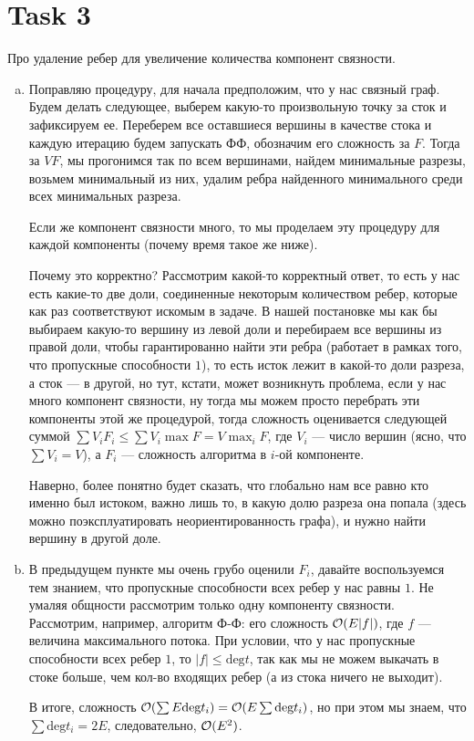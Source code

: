 \section{Task 3}
\begin{task}
    Про удаление ребер для увеличение количества компонент связности.
\end{task}

\begin{solution}
    \begin{enumerate}[a)]
        \item Поправляю процедуру, для начала предположим, что у нас связный граф.
        Будем делать следующее, выберем какую-то произвольную точку за сток и зафиксируем ее.
        Переберем все оставшиеся вершины в качестве стока и каждую итерацию будем запускать ФФ, обозначим его сложность за $F$.
        Тогда за $VF$, мы прогонимся так по всем вершинами, найдем минимальные разрезы, возьмем минимальный из них, удалим ребра найденного минимального среди всех минимальных разреза.

        Если же компонент связности много, то мы проделаем эту процедуру для каждой компоненты (почему время такое же ниже).

        Почему это корректно?
        Рассмотрим какой-то корректный ответ, то есть у нас есть какие-то две доли, соединенные некоторым количеством ребер, которые как раз соответствуют искомым в задаче.
        В нашей постановке мы как бы выбираем какую-то вершину из левой доли и перебираем все вершины из правой доли, чтобы гарантированно найти эти ребра (работает в рамках того, что пропускные способности $1$), то есть исток лежит в какой-то доли разреза, а сток --- в другой, но тут, кстати, может возникнуть проблема, если у нас много компонент связности, ну тогда мы можем просто перебрать эти компоненты этой же процедурой, тогда сложность оценивается следующей суммой $\sum V_i F_i \leq \sum V_i \max F = V\max_i F$, где $V_i$ --- число вершин (ясно, что $\sum V_i = V$), а $F_i$ --- сложность алгоритма в $i$-ой компоненте.

        \begin{remark}
            Наверно, более понятно будет сказать, что глобально нам все равно кто именно был истоком, важно лишь то, в какую долю разреза она попала (здесь можно поэксплуатировать неориентированность графа), и нужно найти вершину в другой доле.
        \end{remark}

        \item В предыдущем пункте мы очень грубо оценили $F_i$, давайте воспользуемся тем знанием, что пропускные способности всех ребер у нас равны $1$.
        Не умаляя общности рассмотрим только одну компоненту связности.
        Рассмотрим, например, алгоритм Ф-Ф: его сложность $\mathcal{O}(E|f|)$, где $f$ --- величина максимального потока.
        При условии, что у нас пропускные способности всех ребер $1$, то $|f| \leq \text{deg}t$, так как мы не можем выкачать в стоке больше, чем кол-во входящих ребер (а из стока ничего не выходит).

        В итоге, сложность $\mathcal{O}(\sum E\text{deg}t_i) = \mathcal{O}(E\sum\text{deg} t_i)$, но при этом мы знаем, что $\sum\text{deg} t_i = 2E$, следовательно, $\mathcal{O}(E^2)$.
    \end{enumerate}
\end{solution}